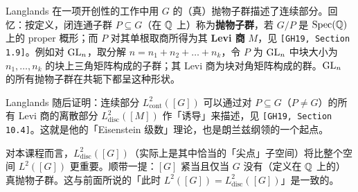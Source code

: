 Langlands 在一项开创性的工作中用 $G$ 的（真）抛物子群描述了连续部分。回忆：按定义，闭连通子群 $P\subseteq G$（在 $\mathbb{Q}$ 上）称为\textbf{抛物子群}，若 $G/P$ 是 $\operatorname{Spec}(\mathbb{Q})$ 上的 proper 概形；而 $P$ 对其单根取商所得为其 \textbf{Levi 商} $M$，见 \texttt{[GH19, Section 1.9]}。例如对 $\operatorname{GL}_n$，取分解 $n=n_1+n_2+\dots+n_k$，令 $P$ 为 $\operatorname{GL}_n$ 中块大小为 $n_1,\dots,n_k$ 的块上三角矩阵构成的子群；其 Levi 商为块对角矩阵构成的群。$\operatorname{GL}_n$ 的所有抛物子群在共轭下都呈这种形状。

Langlands 随后证明：连续部分 $L^2_{\mathrm{cont}}([G])$ 可以通过对 $P\subseteq G$（$P\neq G$）的所有 Levi 商的离散部分 $L^2_{\mathrm{disc}}([M])$ 作「诱导」来描述，见 \texttt{[GH19, Section 10.4]}。这就是他的「Eisenstein 级数」理论，也是朗兰兹纲领的一个起点。

对本课程而言，$L^2_{\mathrm{disc}}([G])$（实际上是其中恰当的「尖点」子空间）将比整个空间 $L^2([G])$ 更重要。顺带一提：$[G]$ 紧当且仅当 $G$ 没有（定义在 $\mathbb{Q}$ 上的）真抛物子群。这与前面所说的「此时 $L^2([G])=L^2_{\mathrm{disc}}([G])$」是一致的。
